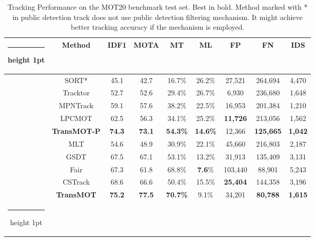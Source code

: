 \documentclass[10pt,twocolumn,letterpaper]{article}
\makeatletter
\newcommand{\thickhline}{\noalign {\ifnum 0=`}\fi \hrule height 1pt
    \futurelet \reserved@a \@xhline
}
\makeatother
\begin{document}
\begin{table}
	\footnotesize
	\begin{center}
	
			\begin{tabular}{@{\hskip 0.2mm}c@{\hskip 0.5mm}|@{\hskip 0.1mm}c@{\hskip 0.1mm}c@{\hskip 1.5mm}c@{\hskip 0.1mm}c@{\hskip 1.5mm}c@{\hskip 1.5mm}c@{\hskip 1.5mm}c@{\hskip 1.5mm}c@{\hskip 1.5mm}}
			\hline\thickhline
			 & Method & IDF1 & MOTA & MT & ML & FP & FN & IDS\\
			\hline
			\multirow{5}{*}{\rotatebox{90}{Public Det.}}
			&SORT*\cite{bewley2016simple} & 45.1 & 42.7 & 16.7\% & 26.2\% & 27,521 & 264,694	& 4,470 \\
			&Tracktor\cite{bergmann2019tracking} & 52.7 & 52.6 & 29.4\% & 26.7\% & 6,930 & 236,680 & 1,648 \\
			
			
			&MPNTrack\cite{braso2020learning} & 59.1 & 57.6 & 38.2\% & 22.5\% & 16,953 & 201,384 & 1,210 \\
			
			&LPCMOT \cite{dai2021learning}& 62.5& 56.3& 34.1\%& 25.2\%& \textbf{11,726} & 213,056 & 1,562 \\
			
			
			\cline{2-9}
			&\textbf{TransMOT-P} &\textbf{74.3}&\textbf{73.1}& \textbf{54.3\%} & \textbf{14.6\%} & 12,366 & \textbf{125,665} & \textbf{1,042}\\
			\hline\hline
			\multirow{5}{*}{\rotatebox{90}{Private Det.}}
			&MLT\cite{zhang2020multiplex} & 54.6 & 48.9 & 30.9\% &22.1\% & 45,660 & 216,803 & 2,187 \\
			
			&GSDT \cite{wang2020joint}& 67.5 & 67.1 & 53.1\%& 13.2\%& 31,913 & 135,409 & 3,131\\
			
			 &Fair \cite{zhang2020fairmot}& 67.3 & 61.8 & 68.8\%& \textbf{7.6}\%& 103,440 & 88,901 & 5,243\\
			


			 &CSTrack \cite{liang2020rethinking}& 68.6 & 66.6 & 50.4\%& 15.5\%& \textbf{25,404} & 144,358 & 3,196\\
			
			\cline{2-9}
			
			 &\textbf{TransMOT} &\textbf{75.2}&\textbf{77.5}&\textbf{70.7\%} &9.1\% &34,201  &\textbf{80,788} & \textbf{1,615} \\
			\hline\thickhline
		\end{tabular}
		
		














	\end{center}
	\vspace{-2mm}
	\caption{Tracking Performance on the MOT20 benchmark test set. Best in bold. Method marked with * in public detection track does not use public detection filtering mechanism. It might achieve better tracking accuracy if the mechanism is employed.}
	\label{table:res20p}
\end{table}
\end{document}
